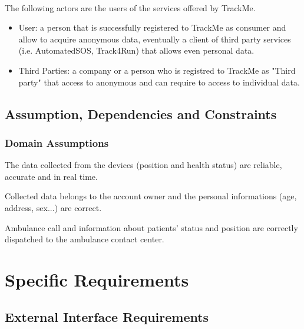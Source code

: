 \documentclass[a4paper]{article}
\begin{document}
\paragraph{}The following actors are the users of the services offered by TrackMe. 


\begin{itemize}
    \item User:  a person that is successfully registered to TrackMe as consumer and allow to acquire anonymous data, eventually a client of third party services (i.e. AutomatedSOS, Track4Run) that allows even personal data.
    
    \item Third Parties:  a company or a person who is registred to TrackMe as "Third party" that access to anonymous and can require to access to individual data.
    
\end{itemize}

\subsection{Assumption, Dependencies and Constraints}

\subsubsection{Domain Assumptions}


\begin{enumerate}[label={[D.\arabic*]}]
    
    \item The data collected from the devices (position and health status) are reliable, accurate and in real time.
    \item Collected data belongs to the account owner and the personal informations (age, address, sex...) are correct.
    \item Ambulance call and information about patients' status and position are correctly dispatched to the ambulance contact center.
    
    
\end{enumerate}


\section{Specific Requirements}

\subsection{External Interface Requirements}
\end{document}

